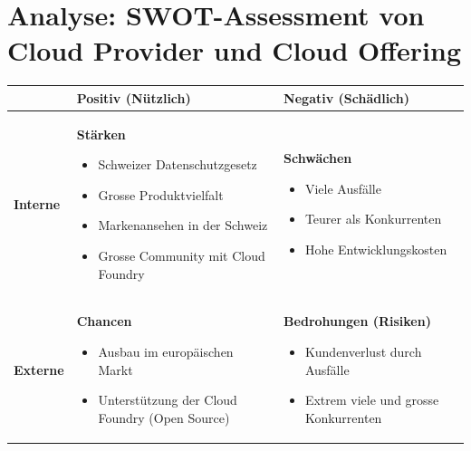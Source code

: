 \chapter{Analyse: SWOT-Assessment von Cloud Provider und Cloud Offering}
\begin{table}[H]
\begin{tabular}{|l|p{}|p{}|}
\hline 
 & \textbf{Positiv (Nützlich)}  & \textbf{Negativ (Schädlich)} \\ \hline 
\textbf{Interne} & \textbf{Stärken} 
\begin{itemize}
\item Schweizer Datenschutzgesetz
\item Grosse Produktvielfalt
\item Markenansehen in der Schweiz
\item Grosse Community mit Cloud Foundry
\end{itemize}

& \textbf{Schwächen}
\begin{itemize}
\item Viele Ausfälle
\item Teurer als Konkurrenten
\item Hohe Entwicklungskosten
\end{itemize}
\\ \hline 
\textbf{Externe} & \textbf{Chancen} 
\begin{itemize}
\item Ausbau im europäischen Markt
\item Unterstützung der Cloud Foundry (Open Source)
\end{itemize}&
\textbf{Bedrohungen (Risiken)} 
 \begin{itemize}
\item Kundenverlust durch Ausfälle
\item Extrem viele und grosse Konkurrenten
\end{itemize}
\\ \hline 
\end{tabular} 
\end{table}

